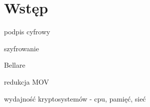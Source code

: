 \chapter*{Wstęp}


podpis cyfrowy

szyfrowanie

Bellare

redukcja MOV

wydajność kryptosystemów - cpu, pamięć, sieć
